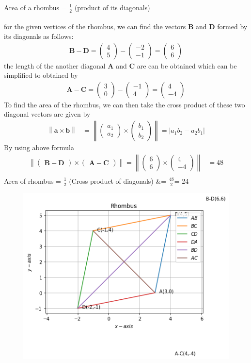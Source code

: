 \documentclass[12pt]{article}
\providecommand{\norm}[1]{\left\lVert#1\right\rVert}
\newcommand{\myvec}[1]{\ensuremath{\begin{pmatrix}#1\end{pmatrix}}}
\let\vec\mathbf
\begin{document}
\begin{enumerate}
Area of a rhombus  = $\frac{1}{2}$ (product of its diagonals)\\\\
for the given vertices of the rhombus, we can find the vectors $\vec{B}$ and $\vec{D}$ formed by its diagonals as follows:
\begin{align}
 \vec{B-D}= \myvec{4 \\ 5} - \myvec{-2 \\-1}= \myvec{6\\6}
\end{align}
the length of the another diagonal $\vec{A}$ and $\vec{C}$ are can be obtained 
which can be simplified to obtained by
\begin{align}
  \vec{A-C}= \myvec{3 \\ 0} - \myvec{-1 \\4}= \myvec{4\\-4}
\end{align}
To find the area of the rhombus, we can then take the cross product of these two diagonal vectors are given by\\
\begin{align}
    \norm{\vec{a}\times \vec{b}} &=\norm{\myvec{a_1\\a_2} \times \myvec{b_1\\b_2}} =  \lvert a_1 b_2 - a_2 b_1 \rvert  
\end{align}
By using above formula
\begin{align}
        \norm{\myvec{\vec{B-D}}\times \myvec{\vec{A-C}}} = \norm{\myvec{6\\6} \times \myvec{4\\-4}} &= 48 \\ 
\end{align}
Area of rhombus = $\frac{1}{2}$ (Cross product of diagonals)
                &= $\frac{48}{2}$= 24
\begin{figure}[!h]
 \begin{center}
  \includegraphics[width=\columnwidth]{./figs/fig.png}
 \end{center}
\caption{}
\label{fig:Fig1}
\end{figure}
\end{enumerate}
\end{document}
